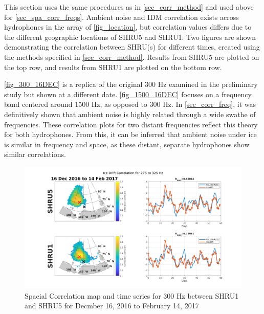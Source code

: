 This section uses the same procedures as in \autoref{sec_corr_method} and used above for \autoref{sec_spa_corr_freqs}. Ambient noise and IDM correlation exists across hydrophones in the array of \autoref{fig_location}, but correlation values differs due to the different geographic locations of SHRU5 and SHRU1. Two figures are shown demonstrating the correlation between SHRU(s) for different times, created using the methods specified in \autoref{sec_corr_method}. Results from SHRU5 are plotted on the top row, and results from SHRU1 are plotted on the bottom row. 

\autoref{fig_300_16DEC} is a replica of the original 300 Hz examined in the preliminary study \parencite{Bonnel2021} but shown at a different date. \autoref{fig_1500_16DEC} focuses on a frequency band centered around 1500 Hz, as opposed to 300 Hz. In \autoref{sec_corr_freq}, it was definitively shown that ambient noise is highly related through a wide swathe of frequencies. These correlation plots for two distant frequencies reflect this theory for both hydrophones. From this, it can be inferred that ambient noise under ice is similar in frequency and space, as these distant, separate hydrophones show similar correlations.   %

\begin{figure}[p]
\centering
\includegraphics[scale=0.35]{Figures/300_spatial_corr_20161216-20170214_275_325.png}
\caption{Spacial Correlation map and time series for 300 Hz between SHRU1 and SHRU5 for Decmber 16, 2016 to February 14, 2017}
\label{fig_300_16DEC}
\end{figure}

